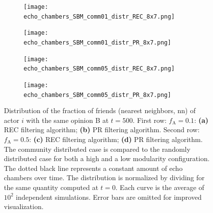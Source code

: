 \documentclass[11 pt , letterpaper , twoside , openright]{book}
\begin{document}
\begin{figure}[H]
  \begin{subfigure}[b]{0.49\textwidth}
    \caption{}
  	\texttt{[image: echo\_chambers\_SBM\_comm01\_distr\_REC\_8x7.png]}
    \label{rec_comm_echo}
  \end{subfigure}
  \begin{subfigure}[b]{0.49\textwidth}
    \caption{}
  	\texttt{[image: echo\_chambers\_SBM\_comm01\_distr\_PR\_8x7.png]}
    \label{pr_comm_echo}
  \end{subfigure}
  \begin{subfigure}[b]{0.49\textwidth}
    \caption{}
  	\texttt{[image: echo\_chambers\_SBM\_comm05\_distr\_REC\_8x7.png]}
    \label{rec_comm05_echo}
  \end{subfigure}
  \begin{subfigure}[b]{0.49\textwidth}
    \caption{}
  	\texttt{[image: echo\_chambers\_SBM\_comm05\_distr\_PR\_8x7.png]}
    \label{pr_comm05_echo}
  \end{subfigure}
  \captionsetup{format=plain}
  \caption[Distribution of the fraction of friends (nearest neighbors, nn) of actor $i$ with the same opinion B at $t = 500$. $10 \%$ and $50 \%$ of the communities is given a single opinion, opinion A, while the remaining communities get an initial $50/50$ opinion distribution. The community distributed case is compared to the corresponding randomly distributed case ($55/45$ or $75/25$) for both a high modularity and a low modularity configuration. Results for the REC and PR filtering algorithms.]{Distribution of the fraction of friends (nearest neighbors, nn) of actor $i$ with the same opinion B at $t = 500$. First row: $f_\text{A} = 0.1$: \textbf{(a)} REC filtering algorithm; \textbf{(b)} PR filtering algorithm. Second row: $f_\text{A} = 0.5$: \textbf{(c)} REC filtering algorithm; \textbf{(d)} PR filtering algorithm. The community distributed case is compared to the randomly distributed case for both a high and a low modularity configuration. The dotted black line represents a constant amount of echo chambers over time. The distribution is normalized by dividing for the same quantity computed at $t=0$. Each curve is the average of $10^2$ independent simulations. Error bars are omitted for improved visualization.}
\label{echo_01_commOp0_other_50-50}
\end{figure}
\noindent
\end{document}
